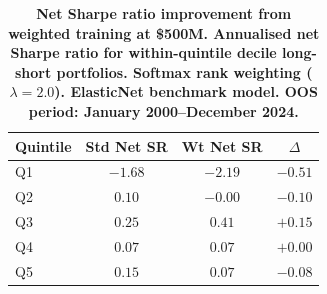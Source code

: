 \begin{table}[t!]
\centering
\begin{tabular}{l cc c}
\midrule
Quintile & Std Net SR & Wt Net SR & $\Delta$ \\
\midrule
Q1 & $-1.68$ & $-2.19$ & $-0.51$ \\
Q2 & $0.10$  & $-0.00$ & $-0.10$ \\
Q3 & $0.25$  & $\mathbf{0.41}$ & $\mathbf{+0.15}$ \\
Q4 & $0.07$  & $0.07$  & $+0.00$ \\
Q5 & $0.15$  & $0.07$  & $-0.08$ \\
\midrule
\end{tabular}
\caption{\footnotesize \bf Net Sharpe ratio improvement from weighted training at \$500M\normalfont. Annualised net Sharpe ratio for within-quintile decile long-short portfolios. Softmax rank weighting ($\lambda = 2.0$). ElasticNet benchmark model. OOS period: January 2000--December 2024.}
\label{tab:net_sr_weighted}
\end{table}
